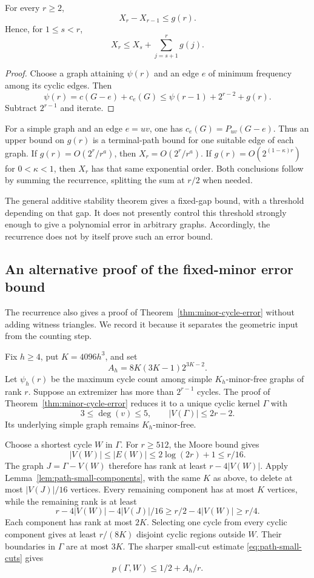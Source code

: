 \begin{proposition}\label{prop:cycle-edge-excess-recurrence}
For every $r\ge2$,
\[
 X_r-X_{r-1}\le g(r).
\]
Hence, for $1\le s<r$,
\[
 X_r\le X_s+\sum_{j=s+1}^r g(j).
\]
\end{proposition}

\begin{proof}
Choose a graph attaining $\psi(r)$ and an edge $e$ of minimum frequency among its cyclic edges.
Then
\[
 \psi(r)=c(G-e)+c_e(G)
 \le\psi(r-1)+2^{r-2}+g(r).
\]
Subtract $2^{r-1}$ and iterate.
\end{proof}

For a simple graph and an edge $e=uv$, one has $c_e(G)=P_{uv}(G-e)$.
Thus an upper bound on $g(r)$ is a terminal-path bound for one suitable edge of each graph.
If $g(r)=O(2^r/r^a)$, then $X_r=O(2^r/r^a)$.
If $g(r)=O(2^{(1-\kappa)r})$ for $0<\kappa<1$, then $X_r$ has that same exponential order.
Both conclusions follow by summing the recurrence, splitting the sum at $r/2$ when needed.

The general additive stability theorem gives a fixed-gap bound, with a threshold depending on that gap.
It does not presently control this threshold strongly enough to give a polynomial error in arbitrary graphs.
Accordingly, the recurrence does not by itself prove such an error bound.

\subsection{An alternative proof of the fixed-minor error bound}

The recurrence also gives a proof of Theorem~\ref{thm:minor-cycle-error} without adding witness triangles.
We record it because it separates the geometric input from the counting step.

Fix $h\ge4$, put $K=4096h^3$, and set
\[
 A_h=8K(3K-1)2^{3K-2}.
\]
Let $\psi_h(r)$ be the maximum cycle count among simple $K_h$-minor-free graphs of rank $r$.
Suppose an extremizer has more than $2^{r-1}$ cycles.
The proof of Theorem~\ref{thm:minor-cycle-error} reduces it to a unique cyclic kernel $\Gamma$ with
\[
 3\le\deg(v)\le5,\qquad |V(\Gamma)|\le2r-2.
\]
Its underlying simple graph remains $K_h$-minor-free.

Choose a shortest cycle $W$ in $\Gamma$.
For $r\ge512$, the Moore bound gives
\[
 |V(W)|\le|E(W)|\le2\log(2r)+1\le r/16.
\]
The graph $J=\Gamma-V(W)$ therefore has rank at least $r-4|V(W)|$.
Apply Lemma~\ref{lem:path-small-components}, with the same $K$ as above, to delete at most $|V(J)|/16$ vertices.
Every remaining component has at most $K$ vertices, while the remaining rank is at least
\[
 r-4|V(W)|-4|V(J)|/16\ge r/2-4|V(W)|\ge r/4.
\]
Each component has rank at most $2K$.
Selecting one cycle from every cyclic component gives at least $r/(8K)$ disjoint cyclic regions outside $W$.
Their boundaries in $\Gamma$ are at most $3K$.
The sharper small-cut estimate \eqref{eq:path-small-cuts} gives
\[
 p(\Gamma,W)\le1/2+A_h/r.
\]

